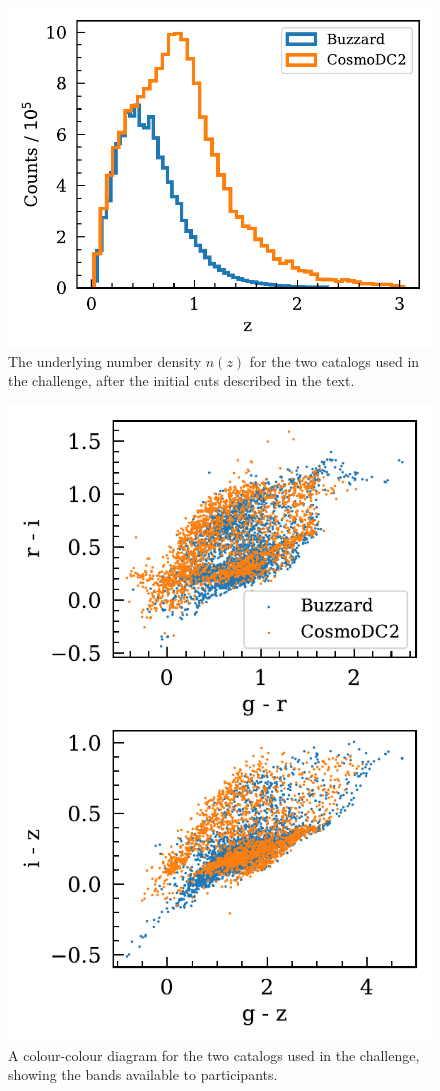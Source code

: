 \documentclass[twocolumn,twocolappendix]{aastex63}
\begin{document}
\begin{figure}[htbp]
\includegraphics[width=0.9\linewidth]{results/initial_data.pdf}
\caption{The underlying number density $n(z)$ for the two catalogs used in the challenge,
after the initial cuts described in the text.}
\label{fig:initial_nz}
\end{figure}

\begin{figure}[htbp]
\includegraphics[width=0.9\linewidth]{results/colour_colour.pdf}
\caption{A colour-colour diagram for the two catalogs used in the challenge, showing the bands
available to participants.}
\label{fig:colour_colour}
\end{figure}
\end{document}
